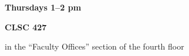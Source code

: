 \documentclass{article}
\begin{document}
\centerline{\fontsize{48}{72} \sffamily \textbf{Thursdays 1--2 pm}}

\vspace*{18 pt}

\centerline{\fontsize{48}{72} \sffamily \textbf{CLSC 427}}

\vspace*{18 pt}

\centerline{\LARGE in the ``Faculty Offices'' section of the fourth floor}


\end{document}
